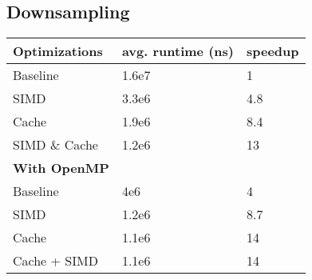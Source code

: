 \documentclass{article}
\begin{document}
\subsection{Downsampling}

\begin{tabular*}{1.05 \textwidth}{|p{}||p{}|p{}}
  \bf Optimizations  & \bf avg. runtime (ns) & \bf speedup
\\ \hline Baseline & 1.6e7 & 1
\\ \hline SIMD & 3.3e6 & 4.8
\\ \hline Cache & 1.9e6 & 8.4
\\ \hline SIMD \& Cache & 1.2e6 & 13
\\ \hline \bf With OpenMP &&
\\ \hline Baseline & 4e6 & 4
\\ \hline SIMD & 1.2e6 & 8.7
\\ \hline Cache & 1.1e6 & 14
\\ \hline Cache + SIMD & 1.1e6 & 14
\end{tabular*}
\end{document}
